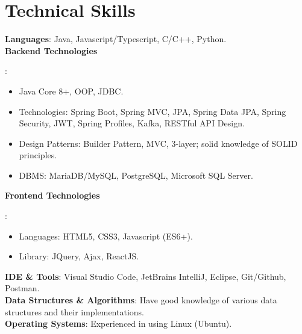 \section{Technical Skills}
    \begin{itemize}[leftmargin=0.15in, label={}]
    \small{\item{
        \textbf{Languages}{: Java, Javascript/Typescript, C/C++, Python.} \\
        \textbf{Backend Technologies}{: 
            \vspace{-0.2cm}
            \begin{itemize}[leftmargin=0.5in]
                \item  Java Core 8+, OOP, JDBC.
                \item Technologies: Spring Boot, Spring MVC, JPA, Spring Data JPA, Spring Security, JWT, Spring Profiles, Kafka, RESTful API Design.
                \item Design Patterns: Builder Pattern, MVC, 3-layer; solid knowledge of SOLID principles.
                \item DBMS: MariaDB/MySQL, PostgreSQL, Microsoft SQL Server.
            \end{itemize}
            \vspace{-0.2cm}
        } 
         \textbf{Frontend Technologies}{: 
            \vspace{-0.2cm}
            \begin{itemize}[leftmargin=0.5in]
                \item Languages: HTML5, CSS3, Javascript (ES6+).
                \item Library: JQuery, Ajax, ReactJS.
            \end{itemize}
            \vspace{-0.2cm}
        } 
        \textbf{IDE \& Tools}{: Visual Studio Code, JetBrains IntelliJ, Eclipse, Git/Github, Postman.}\\
        \textbf{Data Structures \& Algorithms}{: Have good knowledge of  various data structures and their implementations.}\\
        \textbf{Operating Systems}{: Experienced in using Linux (Ubuntu).}
    }}
    \end{itemize}
